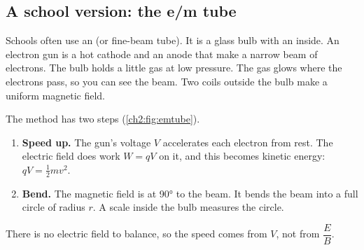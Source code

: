 \subsection*{A school version: the e/m tube}
Schools often use an  (or fine-beam tube). It is a
glass bulb with an  inside. An electron gun is a hot cathode
and an anode that make a narrow beam of electrons. The bulb holds a little gas
at low pressure. The gas glows where the electrons pass, so you can see the
beam. Two coils outside the bulb make a uniform magnetic field.

\begin{sidebyside}[0.44]
  \centering
  \label{ch2:fig:emtube}
\nextside
  The method has two steps (\cref{ch2:fig:emtube}).
  \begin{enumerate}
    \item \textbf{Speed up.} The gun's voltage $V$ accelerates each electron
          from rest. The electric field does work $W = qV$ on it, and this
          becomes kinetic energy: $qV = \tfrac12 mv^2$.
    \item \textbf{Bend.} The magnetic field is at \ang{90} to the beam. It bends
          the beam into a full circle of radius $r$. A scale inside the bulb
          measures the circle.
  \end{enumerate}
  There is no electric field to balance, so the speed comes from $V$, not from
  $\dfrac{E}{B}$.
\end{sidebyside}

